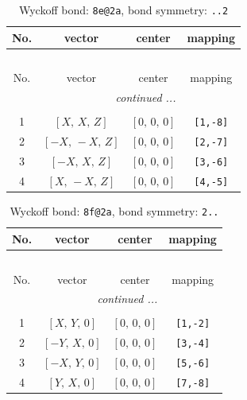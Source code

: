 \documentclass[fleqn,8pt]{jsarticle}
\begin{document}
\renewcommand{\arraystretch}{1.2}
\begin{longtable}{cccc}
\caption{Wyckoff bond: {\tt 8e@2a}, bond symmetry: {\tt ..2}}
 \\
 \hline \hline
No. & vector & center & mapping \\ \hline \endfirsthead

\multicolumn{3}{l}{\tablename\ \thetable{}} \\
 \hline \hline
No. & vector & center & mapping \\ \hline \endhead

 \hline \hline
\multicolumn{3}{r}{\footnotesize\it continued ...} \\ \endfoot

 \hline \hline
\multicolumn{3}{r}{} \\ \endlastfoot

1 & $\left[ X,\, X,\, Z \right]$ & $\left[ 0,\, 0,\, 0 \right]$ & {\tt [1,-8]} \\ \hline
2 & $\left[ - X,\, - X,\, Z \right]$ & $\left[ 0,\, 0,\, 0 \right]$ & {\tt [2,-7]} \\ \hline
3 & $\left[ - X,\, X,\, Z \right]$ & $\left[ 0,\, 0,\, 0 \right]$ & {\tt [3,-6]} \\ \hline
4 & $\left[ X,\, - X,\, Z \right]$ & $\left[ 0,\, 0,\, 0 \right]$ & {\tt [4,-5]} \\
\end{longtable}
\renewcommand{\arraystretch}{1.2}
\begin{longtable}{cccc}
\caption{Wyckoff bond: {\tt 8f@2a}, bond symmetry: {\tt 2..}}
 \\
 \hline \hline
No. & vector & center & mapping \\ \hline \endfirsthead

\multicolumn{3}{l}{\tablename\ \thetable{}} \\
 \hline \hline
No. & vector & center & mapping \\ \hline \endhead

 \hline \hline
\multicolumn{3}{r}{\footnotesize\it continued ...} \\ \endfoot

 \hline \hline
\multicolumn{3}{r}{} \\ \endlastfoot

1 & $\left[ X,\, Y,\, 0 \right]$ & $\left[ 0,\, 0,\, 0 \right]$ & {\tt [1,-2]} \\ \hline
2 & $\left[ - Y,\, X,\, 0 \right]$ & $\left[ 0,\, 0,\, 0 \right]$ & {\tt [3,-4]} \\ \hline
3 & $\left[ - X,\, Y,\, 0 \right]$ & $\left[ 0,\, 0,\, 0 \right]$ & {\tt [5,-6]} \\ \hline
4 & $\left[ Y,\, X,\, 0 \right]$ & $\left[ 0,\, 0,\, 0 \right]$ & {\tt [7,-8]} \\
\end{longtable}
\end{document}
